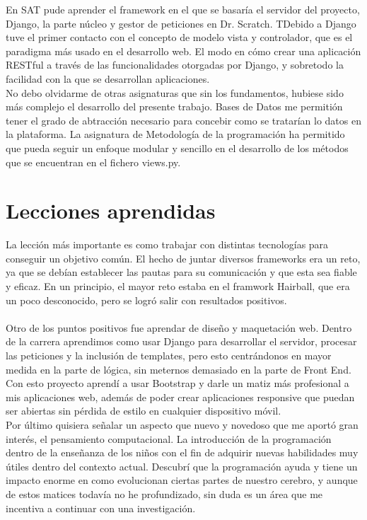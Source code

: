 \documentclass[a4paper, 12pt]{book}
\begin{document}
En SAT pude aprender el framework en el que se basaría el servidor del proyecto,
Django, la parte núcleo y gestor de peticiones en Dr. Scratch. TDebido a Django
tuve el primer contacto con el concepto de modelo vista y controlador, 
que es el paradigma más usado en el desarrollo web. El modo en cómo crear una
 aplicación RESTful a través de las funcionalidades otorgadas por Django, y 
sobretodo la facilidad con la que se desarrollan aplicaciones. \\

No debo olvidarme de otras asignaturas que sin los fundamentos, hubiese sido
más complejo el desarrollo del presente trabajo. Bases de Datos me permitión
tener el grado de abtracción necesario para concebir como se tratarían lo datos
en la plataforma. La asignatura de Metodología de la programación ha permitido
que pueda seguir un enfoque modular y sencillo en el desarrollo de los métodos 
que se encuentran en el fichero views.py.
 


\section{Lecciones aprendidas}
\label{sec:lecciones_aprendidas}

La lección más importante es como trabajar con distintas tecnologías para
conseguir un objetivo común. El hecho de juntar diversos frameworks era
un reto, ya que se debían establecer las pautas para su comunicación y 
que esta sea fiable y eficaz. En un principio, el mayor reto estaba en el
framwork Hairball, que era un poco desconocido, pero se logró salir con
resultados positivos. \\ \\

Otro de los puntos positivos fue aprendar de diseño y maquetación web. Dentro
de la carrera aprendimos como usar Django para desarrollar el servidor, 
procesar las peticiones y la inclusión de templates, pero esto centrándonos
en mayor medida en la parte de lógica, sin meternos demasiado en la parte
de Front End. Con esto proyecto aprendí a usar Bootstrap y darle un matiz
más profesional a mis aplicaciones web, además de poder crear aplicaciones
responsive que puedan ser abiertas sin pérdida de estilo en cualquier
dispositivo móvil. \\

Por último quisiera señalar un aspecto que nuevo y novedoso que me aportó
gran interés, el pensamiento computacional. La introducción de la 
programación dentro de la enseñanza de los niños con el fin de adquirir
nuevas habilidades muy útiles dentro del contexto actual. Descubrí que 
la programación ayuda y tiene un impacto enorme en como evolucionan 
ciertas partes de nuestro cerebro, y aunque de estos matices todavía
no he profundizado, sin duda es un área que me incentiva a continuar con
una investigación. \\
\end{document}
